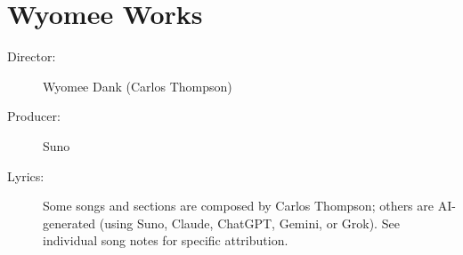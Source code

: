 \chapter{Wyomee Works}

\begin{description}
\item[Director:] Wyomee Dank (Carlos Thompson)
\item[Producer:] Suno
\item[Lyrics:] Some songs and sections are composed by Carlos Thompson; others are AI-generated (using Suno, Claude, ChatGPT, Gemini, or Grok). %
See individual song notes for specific attribution.
\end{description}

\sepbar


























































